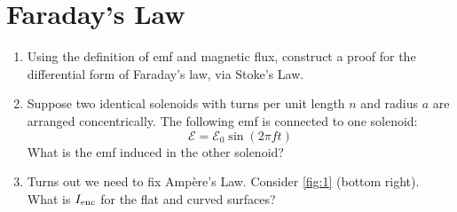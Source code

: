 \documentclass[10pt]{article}
\begin{document}
\section{Faraday's Law}

\begin{enumerate}
\item Using the definition of emf and magnetic flux, construct a proof for the differential form of Faraday's law, via Stoke's Law. \\ \vspace{2cm}
\item Suppose two identical solenoids with turns per unit length $n$ and radius $a$ are arranged concentrically.  The following emf is connected to one solenoid:
\begin{equation}
\mathcal{E} = \mathcal{E}_0 \sin(2\pi f t)
\end{equation}
What is the emf induced in the other solenoid? \\ \vspace{2cm}
\item Turns out we need to fix Amp\`{e}re's Law.  Consider \ref{fig:1} (bottom right).  What is $I_{\rm enc}$ for the flat and curved surfaces?
\end{enumerate}
\end{document}
